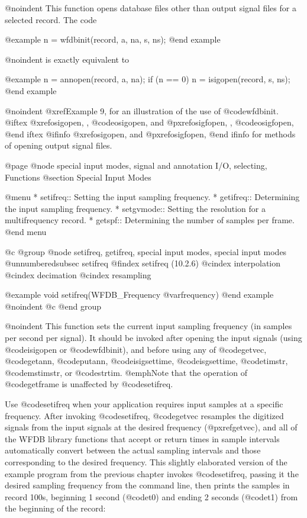 {{{{{{{{{@noindent
This function opens database files other than output signal
files for a selected record.  The code

@example
n = wfdbinit(record, a, na, s, ns);
@end example

@noindent
is exactly equivalent to

@example
n = annopen(record, a, na);
if (n == 0)
    n = isigopen(record, s, ns);
@end example

@noindent
@xref{Example 9}, for an illustration of the use of @code{wfdbinit}.
@iftex
@xref{osigopen, , @code{osigopen}}, and @pxref{osigfopen, , @code{osigfopen}},
@end iftex
@ifinfo
@xref{osigopen}, and @pxref{osigfopen},
@end ifinfo
for methods of opening output signal files.

@page
@node     special input modes, signal and annotation I/O, selecting, Functions
@section Special Input Modes

@menu
* setifreq::			Setting the input sampling frequency.
* getifreq::                    Determining the input sampling frequency.
* setgvmode::                   Setting the resolution for a multifrequency
                                record.
* getspf::                      Determining the number of samples per frame.
@end menu

@c @group
@node     setifreq, getifreq, special input modes, special input modes
@unnumberedsubsec setifreq
@findex setifreq (10.2.6)
@cindex interpolation
@cindex decimation
@cindex resampling

@example
void setifreq(WFDB_Frequency @var{frequency})
@end example
@noindent
@c @end group

@noindent
This function sets the current input sampling frequency (in samples per
second per signal).  It should be invoked after opening the input
signals (using @code{isigopen} or @code{wfdbinit}), and before using any
of @code{getvec}, @code{getann}, @code{putann}, @code{isigsettime},
@code{isgsettime}, @code{timstr}, @code{mstimstr}, or @code{strtim}.
@emph{Note that the operation of @code{getframe} is unaffected by
@code{setifreq}.}

Use @code{setifreq} when your application requires input samples at a
specific frequency.  After invoking @code{setifreq}, @code{getvec}
resamples the digitized signals from the input signals at the desired
frequency (@pxref{getvec}), and all of the WFDB library functions that
accept or return times in sample intervals automatically convert between
the actual sampling intervals and those corresponding to the desired
frequency.  This slightly elaborated version of the example program from
the previous chapter invokes @code{setifreq}, passing it the desired sampling
frequency from the command line, then prints the samples in record 100s,
beginning 1 second (@code{t0}) and ending 2 seconds (@code{t1}) from the
beginning of the record:

}}}}}}}}}
